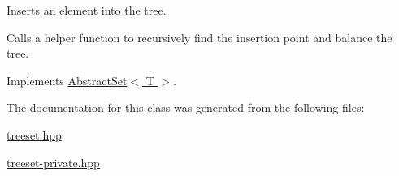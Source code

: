 Inserts an element into the tree. 

Calls a helper function to recursively find the insertion point and balance the tree. 

Implements \hyperlink{class_abstract_set_a12afe4c5cea823491fdfca02cc644bf3}{Abstract\-Set$<$ T $>$}.



The documentation for this class was generated from the following files\-:\begin{DoxyCompactItemize}
\item 
\hyperlink{treeset_8hpp}{treeset.\-hpp}\item 
\hyperlink{treeset-private_8hpp}{treeset-\/private.\-hpp}\end{DoxyCompactItemize}
